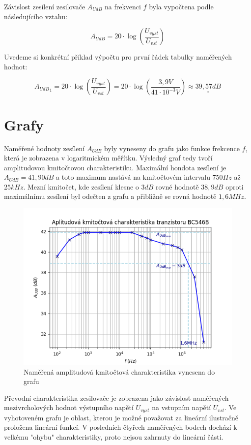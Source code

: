 \documentclass[a4paper, czech]{article}
\begin{document}
Závislost zesílení zesilovače $A_{UdB}$ na frekvenci $f$ byla vypočtena podle následujícího vztahu:

$$A_{UdB}=20 \cdot \log\left(\frac{U_{vyst}}{U_{vst}}\right)$$

Uvedeme si konkrétní příklad výpočtu pro první řádek tabulky naměřených hodnot:

$${A_{UdB}}_1 = 20 \cdot \log\left(\frac{U_{vyst}}{U_{vst}}\right) = 20 \cdot \log\left(\frac{3,9 V}{41 \cdot 10^{-3}V}\right) \approx \underline{\underline{39,57 dB}}$$

\section{Grafy}

Naměřené hodnoty zesílení $A_{UdB}$ byly vyneseny do grafu jako funkce frekcence $f$, která je zobrazena v logaritmickém měřítku. Výsledný graf tedy tvoří amplitudovou kmitočtovou charakteristiku.
Maximální hondota zesílení je $A_{UdB} = 41,90dB$ a toto maximum nastává na kmitočtovém intervalu $750 Hz$ až $25 kHz$.
Mezní kmitočet, kde zesílení klesne o $3 dB$ rovné hodnotě $38,9 dB$ oproti maximálnímu zesílení byl odečten z grafu a přibližně se rovná hodnotě $1,6 MHz$.

\begin{figure}[H]
    \centering
    \includegraphics{akch.png}
    \caption{Naměřená amplitudová kmitočtová charakteristika vynesena do grafu}
\end{figure}

Převodní charakteristika zesilovače je zobrazena jako závislost naměřených mezivrcholových hodnot výstupního napětí $U_{vyst}$ na vstupním napětí $U_{vst}$.
Ve vyhotoveném grafu je oblast, kterou je možné považovat za lineární ilustračně proložena lineární funkcí.
V posledních čtyřech naměŕených bodech dochází k velkému "ohybu" charakteristiky, proto nejsou zahrnuty do lineární části.
\end{document}
